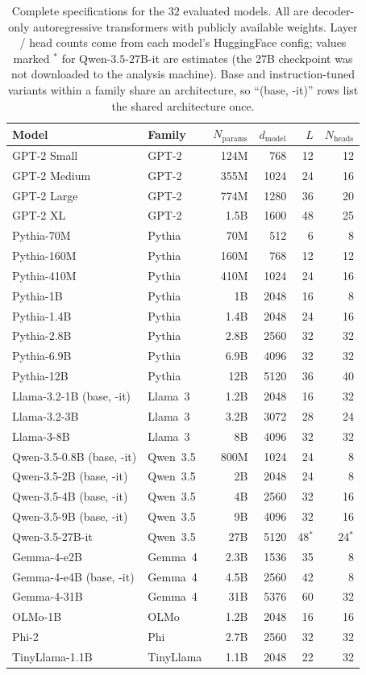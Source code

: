 \documentclass[preprint]{neurips_2025}
\begin{document}
\begin{table}[h]
\centering
\caption{Complete specifications for the $32$ evaluated models. All are decoder-only autoregressive transformers with publicly available weights. Layer / head counts come from each model's HuggingFace config; values marked $^\ast$ for Qwen-$3.5$-$27$B-it are estimates (the 27B checkpoint was not downloaded to the analysis machine). Base and instruction-tuned variants within a family share an architecture, so ``(base, -it)'' rows list the shared architecture once.}
\label{tab:model-details}
\small
\begin{tabular}{@{}llrrrr@{}}
\toprule
\textbf{Model} & \textbf{Family} & $N_{\text{params}}$ & $d_{\text{model}}$ & $L$ & $N_{\text{heads}}$ \\
\midrule
GPT-2 Small & GPT-2 & 124M & 768 & 12 & 12 \\
GPT-2 Medium & GPT-2 & 355M & 1024 & 24 & 16 \\
GPT-2 Large & GPT-2 & 774M & 1280 & 36 & 20 \\
GPT-2 XL & GPT-2 & 1.5B & 1600 & 48 & 25 \\
\midrule
Pythia-70M & Pythia & 70M & 512 & 6 & 8 \\
Pythia-160M & Pythia & 160M & 768 & 12 & 12 \\
Pythia-410M & Pythia & 410M & 1024 & 24 & 16 \\
Pythia-1B & Pythia & 1B & 2048 & 16 & 8 \\
Pythia-1.4B & Pythia & 1.4B & 2048 & 24 & 16 \\
Pythia-2.8B & Pythia & 2.8B & 2560 & 32 & 32 \\
Pythia-6.9B & Pythia & 6.9B & 4096 & 32 & 32 \\
Pythia-12B & Pythia & 12B & 5120 & 36 & 40 \\
\midrule
Llama-3.2-1B (base, -it) & Llama~3 & 1.2B & 2048 & 16 & 32 \\
Llama-3.2-3B & Llama~3 & 3.2B & 3072 & 28 & 24 \\
Llama-3-8B & Llama~3 & 8B & 4096 & 32 & 32 \\
\midrule
Qwen-3.5-0.8B (base, -it) & Qwen~3.5 & 800M & 1024 & 24 & 8 \\
Qwen-3.5-2B (base, -it) & Qwen~3.5 & 2B & 2048 & 24 & 8 \\
Qwen-3.5-4B (base, -it) & Qwen~3.5 & 4B & 2560 & 32 & 16 \\
Qwen-3.5-9B (base, -it) & Qwen~3.5 & 9B & 4096 & 32 & 16 \\
Qwen-3.5-27B-it & Qwen~3.5 & 27B & 5120 & 48$^\ast$ & 24$^\ast$ \\
\midrule
Gemma-4-e2B & Gemma~4 & 2.3B & 1536 & 35 & 8 \\
Gemma-4-e4B (base, -it) & Gemma~4 & 4.5B & 2560 & 42 & 8 \\
Gemma-4-31B & Gemma~4 & 31B & 5376 & 60 & 32 \\
\midrule
OLMo-1B & OLMo & 1.2B & 2048 & 16 & 16 \\
Phi-2 & Phi & 2.7B & 2560 & 32 & 32 \\
TinyLlama-1.1B & TinyLlama & 1.1B & 2048 & 22 & 32 \\
\bottomrule
\end{tabular}
\end{table}
\end{document}
